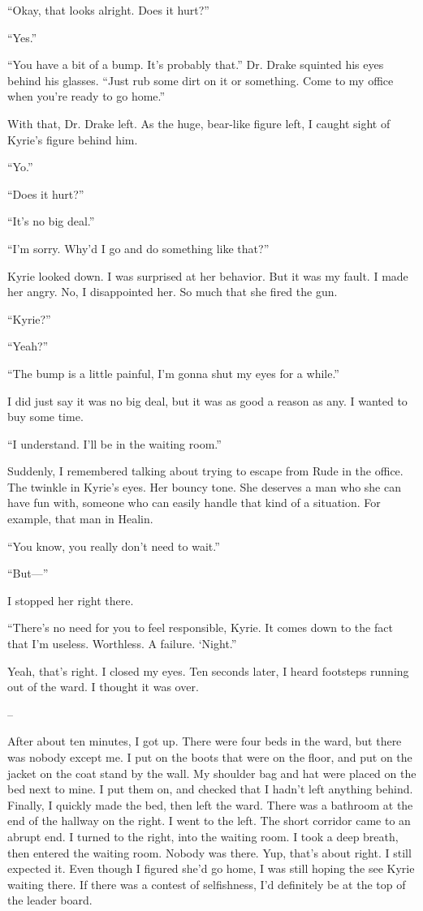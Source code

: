 \documentclass[oneside]{book}
\begin{document}
“Okay, that looks alright. Does it hurt?”

“Yes.”

“You have a bit of a bump. It’s probably that.” Dr. Drake squinted his eyes behind his glasses. “Just rub some dirt on it or something. Come to my office when you’re ready to go home.”

With that, Dr. Drake left. As the huge, bear-like figure left, I caught sight of Kyrie’s figure behind him.

“Yo.”

“Does it hurt?”

“It’s no big deal.”

“I’m sorry. Why’d I go and do something like that?”

Kyrie looked down. I was surprised at her behavior. But it was my fault. I made her angry. No, I disappointed her. So much that she fired the gun.

“Kyrie?”

“Yeah?”

“The bump is a little painful, I’m gonna shut my eyes for a while.”

I did just say it was no big deal, but it was as good a reason as any. I wanted to buy some time.

“I understand. I’ll be in the waiting room.”

Suddenly, I remembered talking about trying to escape from Rude in the office. The twinkle in Kyrie’s eyes. Her bouncy tone. She deserves a man who she can have fun with, someone who can easily handle that kind of a situation. For example, that man in Healin.

“You know, you really don’t need to wait.”

“But—”

I stopped her right there.

“There’s no need for you to feel responsible, Kyrie. It comes down to the fact that I’m useless. Worthless. A failure. ‘Night.”

Yeah, that’s right. I closed my eyes. Ten seconds later, I heard footsteps running out of the ward. I thought it was over.

–

After about ten minutes, I got up. There were four beds in the ward, but there was nobody except me. I put on the boots that were on the floor, and put on the jacket on the coat stand by the wall. My shoulder bag and hat were placed on the bed next to mine. I put them on, and checked that I hadn’t left anything behind. Finally, I quickly made the bed, then left the ward. There was a bathroom at the end of the hallway on the right. I went to the left. The short corridor came to an abrupt end. I turned to the right, into the waiting room. I took a deep breath, then entered the waiting room. Nobody was there. Yup, that’s about right. I still expected it. Even though I figured she’d go home, I was still hoping the see Kyrie waiting there. If there was a contest of selfishness, I’d definitely be at the top of the leader board.
\end{document}
